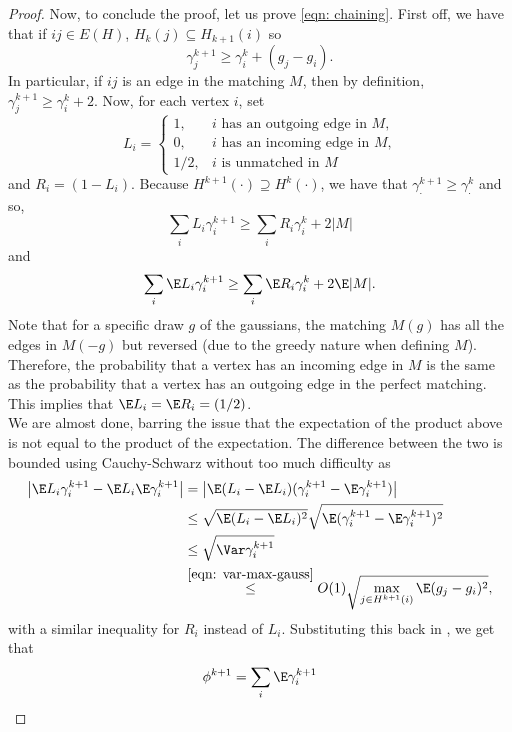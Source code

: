 \begin{proof}
		Now, to conclude the proof, let us prove \cref{eqn: chaining}. First off, we have that if $ij \in E(H)$, $H_k(j) \subseteq H_{k+1}(i)$ so
		\[ \gamma_j^{k+1} \ge \gamma_i^k + (g_j - g_i). \]
		In particular, if $ij$ is an edge in the matching $M$, then by definition, $\gamma_j^{k+1} \ge \gamma_i^k + 2$.
		Now, for each vertex $i$, set
		\[ L_i = \begin{cases} 1, & \text{$i$ has an outgoing edge in $M$,} \\ 0, & \text{$i$ has an incoming edge in $M$,} \\ 1/2, & \text{$i$ is unmatched in $M$} \end{cases} \]
		and $R_i = (1-L_i)$. Because $H^{k+1}(\cdot) \supseteq H^k(\cdot)$, we have that $\gamma_{\cdot}^{k+1} \ge \gamma_{\cdot}^k$ and so,
		\[ \sum_i L_i \gamma_i^{k+1} \ge \sum_i R_i \gamma_i^k + 2|M| \]
		and
		\begin{equation}
			\label{eqn: arv-chaining-penult}
			\sum_i \E L_i \gamma_i^{k+1} \ge \sum_i \E R_i \gamma_i^k + 2 \E |M|.
		\end{equation}
		Note that for a specific draw $g$ of the gaussians, the matching $M(g)$ has all the edges in $M(-g)$ but reversed (due to the greedy nature when defining $M$). Therefore, the probability that a vertex has an incoming edge in $M$ is the same as the probability that a vertex has an outgoing edge in the perfect matching. This implies that $\E L_i = \E R_i = (1/2)$. \\
		We are almost done, barring the issue that the expectation of the product above is not equal to the product of the expectation. The difference between the two is bounded using Cauchy-Schwarz without too much difficulty as
		\begin{align*}
			\left| \E L_i \gamma_i^{k+1} - \E L_i \E \gamma_i^{k+1} \right| &= \left| \E (L_i - \E L_i)(\gamma_i^{k+1} - \E \gamma_i^{k+1}) \right| \\
				&\le \sqrt{\E (L_i - \E L_i)^2} \sqrt{\E(\gamma_i^{k+1} - \E \gamma_i^{k+1})^2} \\
				&\le \sqrt{\Var \gamma_i^{k+1}} \\
				&\stackrel{\eqref{eqn: var-max-gauss}}{\le} O(1) \sqrt{\max_{j \in H^{k+1}(i)} \E (g_j - g_i)^2}, \\
		\end{align*}
		with a similar inequality for $R_i$ instead of $L_i$.
		Substituting this back in , we get that
		\begin{align*}
			\phi^{k+1} &= \sum_i \E \gamma_i^{k+1} \\

\end{align*}
\end{proof}
